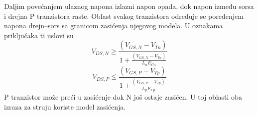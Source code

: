 Daljim povećanjem ulaznog napona izlazni napon opada, dok napon između sorsa i drejna P tranzistora raste. Oblast svakog tranzistora određuje se poređenjem napona drejn–sors sa granicom zasićenja njegovog modela. U oznakama priključaka ti uslovi su
\[V_{DS,N} \ge \frac{(V_{GS,N}-V_{Tn})}{1+\frac{(V_{GS,N}-V_{Tn})}{L_nE_{Cn}}}\]
\[V_{DS,P} \le \frac{(V_{GS,P}-V_{Tp})}{1+\frac{(V_{GS,P}-V_{Tp})}{L_pE_{Cp}}}\]
P tranzistor može preći u zasićenje dok N još ostaje zasićen. U toj oblasti oba izraza za struju koriste model zasićenja.

